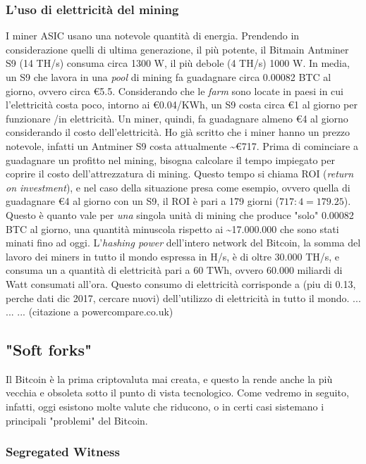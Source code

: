 \documentclass {article}
\begin{document}
\subsubsection {L'uso di elettricità del mining}


I miner ASIC usano una notevole quantità di energia. Prendendo in considerazione quelli di ultima generazione, il più potente, il Bitmain Antminer S9 (14 TH/s) consuma circa 1300 W, il più debole (4 TH/s) 1000 W.
In media, un S9 che lavora in una \textit{pool} di mining fa guadagnare circa 0.00082 BTC al giorno, ovvero circa \euro{5.5}.
Considerando che le \textit{farm} sono locate in paesi in cui l'elettricità costa poco, intorno ai \euro{0.04}/KWh, un S9 costa circa \euro{1} al giorno per funzionare /in elettricità.
Un miner, quindi, fa guadagnare almeno \euro{4} al giorno considerando il costo dell'elettricità.
Ho già scritto che i miner hanno un prezzo notevole, infatti un Antminer S9 costa attualmente \textasciitilde \euro{717}.
Prima di cominciare a guadagnare un profitto nel mining, bisogna calcolare il tempo impiegato per coprire il costo dell'attrezzatura di mining.
Questo tempo si chiama ROI (\textit{return on investment}), e nel caso della situazione presa come esempio, ovvero quella di guadagnare \euro{4} al giorno con un S9, il ROI è pari a 179 giorni ($717 : 4 = 179.25$).
Questo è quanto vale per \emph{una} singola unità di mining che produce "solo" 0.00082 BTC al giorno, una quantità minuscola rispetto ai \textasciitilde 17.000.000 che sono stati minati fino ad oggi.
L'\textit{hashing power} dell'intero network del Bitcoin, la somma del lavoro dei miners in tutto il mondo espressa in H/s, è di oltre 30.000 TH/s, e consuma un a quantità di elettricità pari a 60 TWh, ovvero 60.000 miliardi di Watt consumati all'ora.
Questo consumo di elettricità corrisponde a (piu di 0.13, perche dati dic 2017, cercare nuovi) dell'utilizzo di elettricità in tutto il mondo.
... ... ... (citazione a powercompare.co.uk)


\subsection {"Soft forks"}


Il Bitcoin è la prima criptovaluta mai creata, e questo la rende anche la più vecchia e obsoleta sotto il punto di vista tecnologico. Come vedremo in seguito, infatti, oggi esistono molte valute che riducono, o in certi casi sistemano i principali "problemi" del Bitcoin.


\subsubsection {Segregated Witness}
\end{document}
